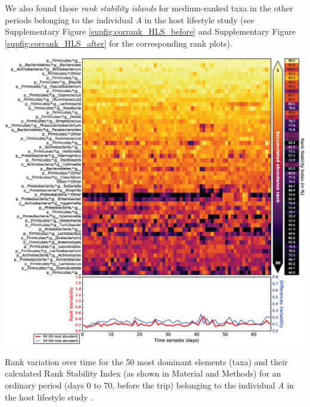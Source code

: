 We also found those \emph{rank stability islands} for medium-ranked taxa in the other periods belonging to the individual \emph{A} in the host lifestyle study \cite{hostlife} (see Supplementary Figure \ref{supfig:corrank_HLS_before} and Supplementary Figure \ref{supfig:corrank_HLS_after} for the corresponding rank plots).

\begin{supfig}
	\centering
	\includegraphics[width=1.0\textwidth]{figs/supfig_corrank_HLS_StoolA_before.eps}
	\caption{Rank variation over time for the 50 most dominant elements (taxa) and their calculated Rank Stability Index (as shown in Material and Methods) for an ordinary period (days 0 to 70, before the trip) belonging to the individual \emph{A} in the host lifestyle study \cite{hostlife}.}
	\label{supfig:corrank_HLS_before}
\end{supfig}


